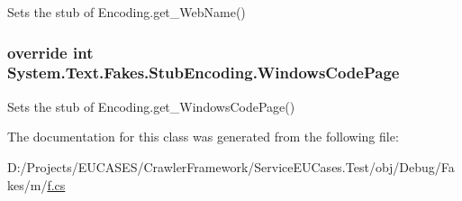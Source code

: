 Sets the stub of Encoding.\-get\-\_\-\-Web\-Name()

\hypertarget{class_system_1_1_text_1_1_fakes_1_1_stub_encoding_ab99fe3593a8ce57d23a5cf7293b21225}{
\subsubsection[{Windows\-Code\-Page}]{\setlength{\rightskip}{0pt plus 5cm}override int System.\-Text.\-Fakes.\-Stub\-Encoding.\-Windows\-Code\-Page\hspace{0.3cm}{\ttfamily [get]}}}\label{class_system_1_1_text_1_1_fakes_1_1_stub_encoding_ab99fe3593a8ce57d23a5cf7293b21225}


Sets the stub of Encoding.\-get\-\_\-\-Windows\-Code\-Page()



The documentation for this class was generated from the following file\-:\begin{DoxyCompactItemize}
\item 
D\-:/\-Projects/\-E\-U\-C\-A\-S\-E\-S/\-Crawler\-Framework/\-Service\-E\-U\-Cases.\-Test/obj/\-Debug/\-Fakes/m/\hyperlink{m_2f_8cs}{f.\-cs}\end{DoxyCompactItemize}
